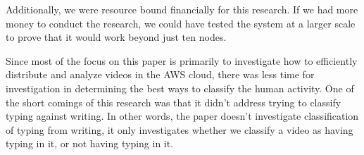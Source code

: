 Additionally, we were resource bound financially for this research. If we had more
money to conduct the research, we could have tested the system at a larger
scale to prove that it would work beyond just ten nodes.

Since most of the focus on this paper is primarily to investigate how to
efficiently distribute and analyze videos in the AWS cloud, there was less time
for investigation in determining the best ways to classify the human activity.
One of the short comings of this research was that it didn't address trying to
classify typing against writing. In other words, the paper doesn't investigate
classification of typing from writing, it only investigates whether we classify
a video as having typing in it, or not having typing in it.




